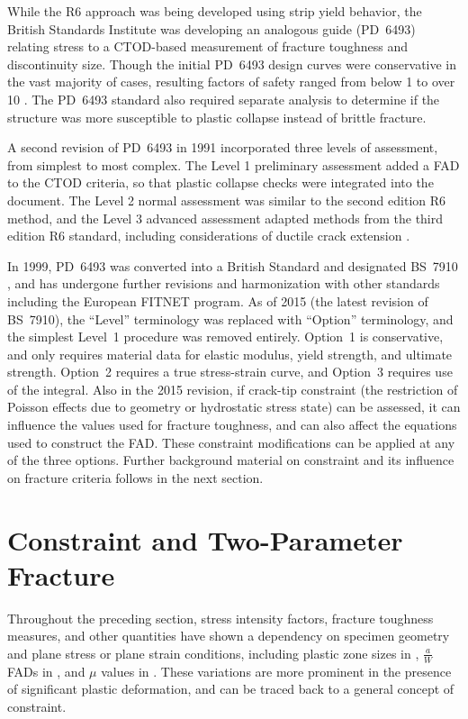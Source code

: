 While the R6 approach was being developed using strip yield behavior, the British Standards Institute was developing an analogous guide (PD~6493) \cite{pd6493-1991} relating stress to a CTOD-based measurement of fracture toughness and discontinuity size.
Though the initial PD~6493 design curves were conservative in the vast majority of cases, resulting factors of safety ranged from below 1 to over 10 \citep{anderson2005}.
The PD~6493 standard also required separate analysis to determine if the structure was more susceptible to plastic collapse instead of brittle fracture.

A second revision of PD~6493 in 1991 incorporated three levels of assessment, from simplest to most complex.
The Level 1 preliminary assessment added a FAD to the CTOD criteria, so that plastic collapse checks were integrated into the document.
The Level 2 normal assessment was similar to the second edition R6 method, and the Level 3 advanced assessment adapted methods from the third edition R6 standard, including considerations of ductile crack extension \citep{WIESNER2000883}.

In 1999, PD~6493 was converted into a British Standard and designated BS~7910 \cite{bs7910-1999}, and has undergone further revisions and harmonization with other standards including the European FITNET program.
As of 2015 (the latest revision of BS~7910), the ``Level'' terminology was replaced with ``Option'' terminology, and the simplest Level~1 procedure was removed entirely.
Option~1 is conservative, and only requires material data for elastic modulus, yield strength, and ultimate strength.
Option~2 requires a true stress-strain curve, and Option~3 requires use of the \J integral.
Also in the 2015 revision, if crack-tip constraint (the restriction of Poisson effects due to geometry or hydrostatic stress state) can be assessed, it can influence the values used for fracture toughness, and can also affect the equations used to construct the FAD.
These constraint modifications can be applied at any of the three options.
Further background material on constraint and its influence on fracture criteria follows in the next section.

\section{Constraint and Two-Parameter Fracture}

Throughout the preceding section, stress intensity factors, fracture toughness measures, and other quantities have shown a dependency on specimen geometry and plane stress or plane strain conditions, including
plastic zone sizes in , \(\frac{a}{W}\) FADs in , and \(\mu\) values in .
These variations are more prominent in the presence of significant plastic deformation, and can be traced back to a general concept of constraint.

